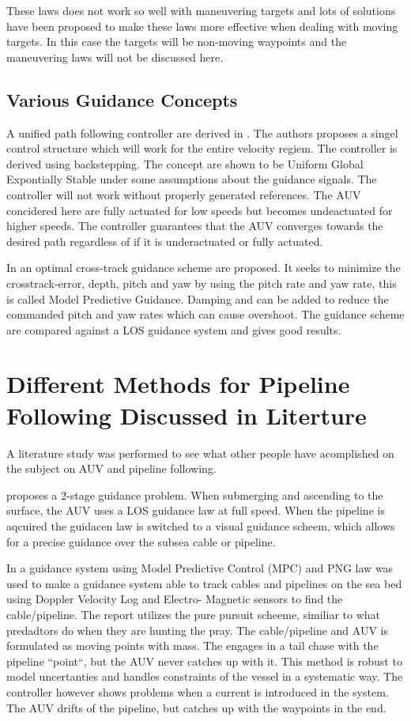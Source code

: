         These laws does not work so well with maneuvering targets and lots of solutions have been proposed
	to make these laws more effective when dealing with moving targets. In this case the targets will be
	non-moving waypoints and the maneuvering laws will not be discussed here.
	
	
	\subsection{Various Guidance Concepts}
		A unified path following controller are derived in \cite{control-concept-AUV}. The 
		authors proposes a singel control structure which will work for the entire velocity regiem.
		The controller is derived using backstepping. The concept are shown to be Uniform Global
		Expontially Stable under some assumptions about the guidance signals. The controller will not
		work without properly generated references. The AUV concidered here are fully actuated for low
		speeds but becomes undeactuated for higher speeds. The controller guarantees that the AUV
		converges towards the desired path regardless of if it is underactuated or fully actuated.
		
		In \cite{optimal-cross-track} an optimal cross-track guidance scheme are proposed. It seeks to minimize
		the crosstrack-error, depth, pitch and yaw by using the pitch rate and yaw rate, this is called Model
		Predictive Guidance. Damping and can be added to reduce the commanded pitch and yaw rates which can
		cause overshoot. The guidance scheme are compared against a LOS guidance system and gives good
		results.

	
\section{Different Methods for Pipeline Following Discussed in Literture}
	A literature study was performed to see what other people have acomplished on the subject on AUV and 
	pipeline following. 
	
	\cite{GuidanceReview} proposes a 2-stage guidance problem. When submerging and ascending to the surface, 
	the AUV uses a LOS guidance law at full speed. When the pipeline is aqcuired the guidacen law is switched 
	to a visual guidance scheem, which allows for a precise guidance over the subsea cable or pipeline. 
		
	In \cite{MPC_pure_pursuit} a guidance system using Model Predictive Control (MPC) and PNG law was used to make 
	a guidance system able to track cables and pipelines on the sea bed using Doppler Velocity Log and Electro-
	Magnetic sensors to find the cable/pipeline. The report utilizes the pure pursuit scheeme, similiar to what 
	predadtors do when they are hunting the pray. The cable/pipeline and AUV is formulated as moving points with 
	mass. The engages in a tail chase with the pipeline ``point``, but the AUV never catches up with it. This 
	method is robust to model uncertanties and handles constraints of the vessel in a systematic way. The controller
	however shows problems when a current is introduced in the system. The AUV drifts of the pipeline, but catches 
	up with the waypoints in the end.
	
